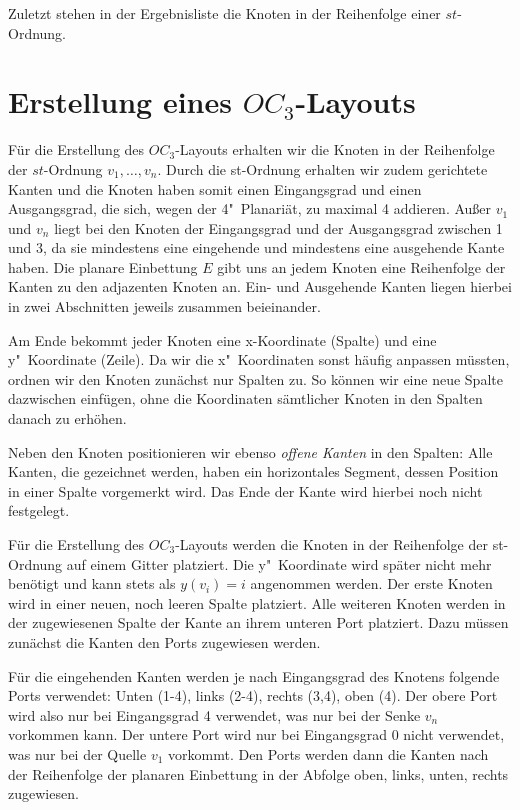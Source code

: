 \documentclass[a4paper]{scrreprt}
\theoremstyle{definition}
\begin{document}
Zuletzt stehen in der Ergebnisliste die Knoten in der Reihenfolge einer $st$-Ordnung.

\section{Erstellung eines $OC_3$-Layouts}

\cite{liu+etal-98} \cite{biedl+kant-98}

Für die Erstellung des $OC_3$-Layouts erhalten wir die Knoten in der Reihenfolge der $st$-Ordnung $v_1, \dots, v_n$. Durch die st-Ordnung erhalten wir zudem gerichtete Kanten und die Knoten haben somit einen Eingangsgrad und einen Ausgangsgrad, die sich, wegen der 4"~Planariät, zu maximal 4 addieren. Außer $v_1$ und $v_n$ liegt bei den Knoten der Eingangsgrad und der Ausgangsgrad zwischen 1 und 3, da sie mindestens eine eingehende und mindestens eine ausgehende Kante haben. Die planare Einbettung $E$ gibt uns an jedem Knoten eine Reihenfolge der Kanten zu den adjazenten Knoten an. Ein- und Ausgehende Kanten liegen hierbei in zwei Abschnitten jeweils zusammen beieinander.

Am Ende bekommt jeder Knoten eine x-Koordinate (Spalte) und eine y"~Koordinate (Zeile). Da wir die x"~Koordinaten sonst häufig anpassen müssten, ordnen wir den Knoten zunächst nur Spalten zu. So können wir eine neue Spalte dazwischen einfügen, ohne die Koordinaten sämtlicher Knoten in den Spalten danach zu erhöhen. 

Neben den Knoten positionieren wir ebenso \emph{offene Kanten} in den Spalten: Alle Kanten, die gezeichnet werden, haben ein horizontales Segment, dessen Position in einer Spalte vorgemerkt wird. Das Ende der Kante wird hierbei noch nicht festgelegt. %

Für die Erstellung des $OC_3$-Layouts werden die Knoten in der Reihenfolge der st-Ordnung auf einem Gitter platziert. Die y"~Koordinate wird später nicht mehr benötigt und kann stets als $y(v_i) = i$ angenommen werden. Der erste Knoten wird in einer neuen, noch leeren Spalte platziert. Alle weiteren Knoten werden in der zugewiesenen Spalte der Kante an ihrem unteren Port platziert. Dazu müssen zunächst die Kanten den Ports zugewiesen werden.

Für die eingehenden Kanten werden je nach Eingangsgrad des Knotens folgende Ports verwendet: Unten (1-4), links (2-4), rechts (3,4), oben (4). Der obere Port wird also nur bei Eingangsgrad 4 verwendet, was nur bei der Senke $v_n$ vorkommen kann. Der untere Port wird nur bei Eingangsgrad 0 nicht verwendet, was nur bei der Quelle $v_1$ vorkommt. Den Ports werden dann die Kanten nach der Reihenfolge der planaren Einbettung in der Abfolge oben, links, unten, rechts zugewiesen.
\end{document}

